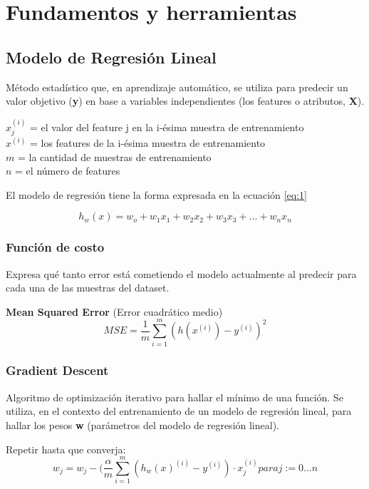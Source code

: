 \documentclass[
11pt, %
oneside, %
spanish, %
singlespacing, %
parskip, %
headsepline, %
chapterinoneline, %
]{MastersDoctoralThesis} %
\begin{document}
\chapter{Fundamentos y herramientas}

\section{Modelo de Regresión Lineal \cite{ml}}
Método estadístico que, en aprendizaje automático, se utiliza para predecir un valor objetivo (\textbf{y}) en base a variables independientes (los features o atributos, \textbf{X}).

$ x_{j}^{(i)} $ = el valor del feature j en la i-ésima muestra de entrenamiento \\
$ x^{(i)} $ = los features de la i-ésima muestra de entrenamiento \\
$ m $ = la cantidad de muestras de entrenamiento \\
$ n $ = el número de features 

El modelo de regresión tiene la forma expresada en la ecuación \ref{eq:1}

\begin{equation}
h_{w}(x) = w_{o} + w_{1}x_{1} + w_{2}x_{2} + w_{3}x_{3} + ... + w_{n}x_{n} \label{eq:1}
\end{equation}

\subsection*{Función de costo}
Expresa qué tanto error está cometiendo el modelo actualmente al predecir para cada una de las muestras del dataset.

\textbf{Mean Squared Error} (Error cuadrático medio)
\begin{equation}
MSE = \frac{1}{m} \sum_{i=1}^{m} (h(x^{(i)}) - y^{(i)})^2
\end{equation} 

\subsection*{Gradient Descent}
Algoritmo de optimización iterativo para hallar el mínimo de una función. Se utiliza, en el contexto del entrenamiento de un modelo de regresión lineal, para hallar los pesos \textbf{w} (parámetros del modelo de regresión lineal).

Repetir hasta que converja:
\begin{equation}
w_{j} = w_{j} - (\frac{\alpha}{m} \sum_{i=1}^{m} (h_{w}(x)^{(i)} - y^{(i)}) \cdot x_{j}^{(i)} para j := 0...n
\end{equation}
\end{document}
